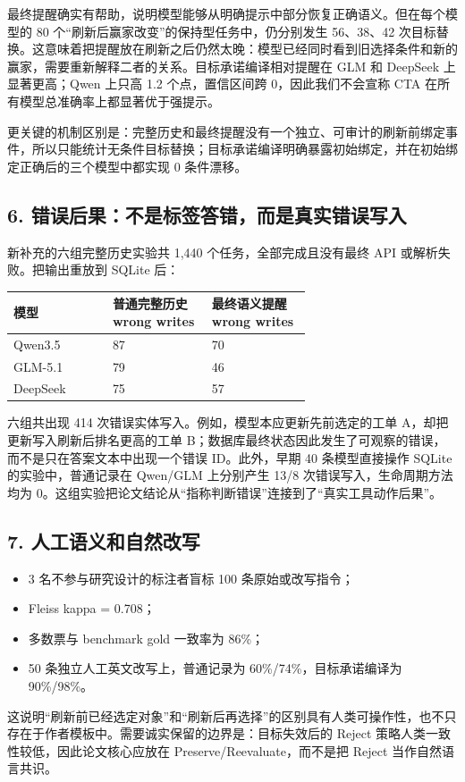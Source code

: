 \documentclass[10pt,fontset=none]{ctexart}
\begin{document}
\par 最终提醒确实有帮助，说明模型能够从明确提示中部分恢复正确语义。但在每个模型的 80 个“刷新后赢家改变”的保持型任务中，仍分别发生 56、38、42 次目标替换。这意味着把提醒放在刷新之后仍然太晚：模型已经同时看到旧选择条件和新的赢家，需要重新解释二者的关系。目标承诺编译相对提醒在 GLM 和 DeepSeek 上显著更高；Qwen 上只高 1.2 个点，置信区间跨 0，因此我们不会宣称 CTA 在所有模型总准确率上都显著优于强提示。
\par 更关键的机制区别是：完整历史和最终提醒没有一个独立、可审计的刷新前绑定事件，所以只能统计无条件目标替换；目标承诺编译明确暴露初始绑定，并在初始绑定正确后的三个模型中都实现 0 条件漂移。
\subsection{6. 错误后果：不是标签答错，而是真实错误写入}
\par 新补充的六组完整历史实验共 1,440 个任务，全部完成且没有最终 API 或解析失败。把输出重放到 SQLite 后：
\begin{longtable}{@{}p{0.220\linewidth} p{0.220\linewidth} p{0.220\linewidth}@{}}
\toprule
模型 & 普通完整历史 wrong writes & 最终语义提醒 wrong writes \\
\midrule\endhead
Qwen3.5 & 87 & 70 \\
GLM-5.1 & 79 & 46 \\
DeepSeek & 75 & 57 \\
\bottomrule
\end{longtable}

\par 六组共出现 414 次错误实体写入。例如，模型本应更新先前选定的工单 A，却把更新写入刷新后排名更高的工单 B；数据库最终状态因此发生了可观察的错误，而不是只在答案文本中出现一个错误 ID。此外，早期 40 条模型直接操作 SQLite 的实验中，普通记录在 Qwen/GLM 上分别产生 13/8 次错误写入，生命周期方法均为 0。这组实验把论文结论从“指称判断错误”连接到了“真实工具动作后果”。
\subsection{7. 人工语义和自然改写}
\begin{itemize}
\item 3 名不参与研究设计的标注者盲标 100 条原始或改写指令；
\item Fleiss kappa = 0.708；
\item 多数票与 benchmark gold 一致率为 86\%；
\item 50 条独立人工英文改写上，普通记录为 60\%/74\%，目标承诺编译为 90\%/98\%。
\end{itemize}
\par 这说明“刷新前已经选定对象”和“刷新后再选择”的区别具有人类可操作性，也不只存在于作者模板中。需要诚实保留的边界是：目标失效后的 Reject 策略人类一致性较低，因此论文核心应放在 Preserve/Reevaluate，而不是把 Reject 当作自然语言共识。
\end{document}
